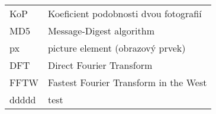 
\seznamzkr

\begin{tabular}{ll}
  KoP	& Koeficient podobnosti dvou fotografií	\\
  MD5	& Message-Digest algorithm				\\
  px	& picture element (obrazový prvek)		\\
  DFT	& Direct Fourier Transform				\\
  FFTW	& Fastest Fourier Transform in the West \\
  ddddd	& test
\end{tabular}

